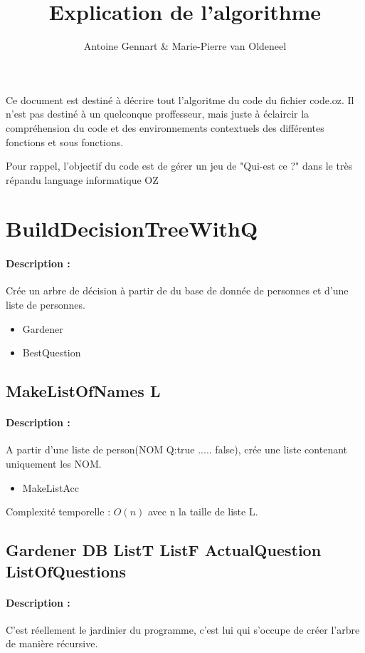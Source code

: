 \documentclass[10pt,a4paper]{article}
\author{Antoine Gennart \& Marie-Pierre van Oldeneel}
\title{Explication de l'algorithme}
\begin{document}
\maketitle

Ce document est destiné à décrire tout l'algoritme du code du fichier code.oz. Il n'est pas destiné à un quelconque proffesseur, mais juste à éclaircir la compréhension du code et des environnements contextuels des différentes fonctions et sous fonctions.

Pour rappel, l'objectif du code est de gérer un jeu de "Qui-est ce ?" dans le très répandu language informatique OZ

\tableofcontents
\newpage

\section{BuildDecisionTreeWithQ}
\paragraph{Description :} Crée un arbre de décision à partir de du base de donnée de personnes et d'une liste de personnes.

\begin{itemize}
\item Gardener
\item BestQuestion
\end{itemize}

\subsection{MakeListOfNames L}
\paragraph{Description :} A partir d'une liste de person(NOM Q:true ..... false), crée une liste contenant uniquement les NOM.

\begin{itemize}
\item MakeListAcc
\end{itemize}

Complexité temporelle : $O(n)$ avec n la taille de liste L.

\subsection{Gardener DB ListT ListF ActualQuestion ListOfQuestions}
\paragraph{Description :} C'est réellement le jardinier du programme, c'est lui qui s'occupe de créer l'arbre de manière récursive.
\end{document}
